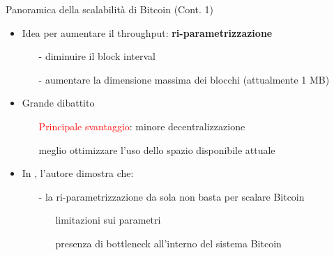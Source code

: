 \documentclass{beamer}
\begin{document}
  
  
  
  
  \begin{frame}{Panoramica della scalabilità di Bitcoin (Cont. 1)}
      \begin{itemize}
          \item Idea per aumentare il throughput: \textbf{ri-parametrizzazione}
          \begin{itemize}
              \item[-] diminuire il block interval
              \item[-] aumentare la dimensione massima dei blocchi (attualmente 1 MB)
          \end{itemize}
          \item Grande dibattito 
          \begin{itemize}
              \item[\MVRightarrow] \textcolor{red}{Principale svantaggio}: minore decentralizzazione
              \item[\MVRightarrow] meglio ottimizzare l'uso dello spazio disponibile attuale
          \end{itemize}
          \item In \cite{croman-scaling-blockchain}, l'autore dimostra che: 
          \begin{itemize}
              \item[-] la ri-parametrizzazione da sola non basta per scalare Bitcoin
              \begin{itemize}
                  \item[\MVRightarrow] limitazioni sui parametri
                  \item[\MVRightarrow] presenza di bottleneck all'interno del sistema Bitcoin
              \end{itemize}
          \end{itemize}
      \end{itemize}
  \end{frame}
  
 
  
  
  
\end{document}
